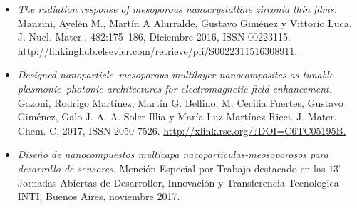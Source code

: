 \begin{itemize}[leftmargin=0cm,label={}]
    \item  \textit{The radiation response of mesoporous nanocrystalline zirconia thin films.} Manzini, Ayelén M., Martín A Alurralde, Gustavo Giménez y Vittorio Luca. J. Nucl. Mater., 482:175–186, Diciembre 2016, ISSN 00223115. \url{http://linkinghub.elsevier.com/retrieve/pii/S0022311516308911.}

    \item \textit{Designed nanoparticle–mesoporous multilayer nanocomposites as tunable
    plasmonic–photonic architectures for electromagnetic field enhancement.}  Gazoni, Rodrigo Martínez, Martín G. Bellino, M. Cecilia Fuertes, Gustavo Giménez, Galo J. A. A. Soler-Illia y María Luz Martínez Ricci. J. Mater. Chem. C, 2017, ISSN 2050-7526. \url{http://xlink.rsc.org/?DOI=C6TC05195B.} 
    
    \item \textit{Diseño de nanocompuestos multicapa nacoparticulas-meosoporosos para desarrollo de sensores}. Mención Especial por Trabajo destacado en las $13^{\circ}$ Jornadas Abiertas de Desarrollor, Innovación y Transferencia Tecnologica - INTI, Buenos Aires, noviembre 2017.

  \end{itemize}	

  \let\thispagestyle=\originalstyle